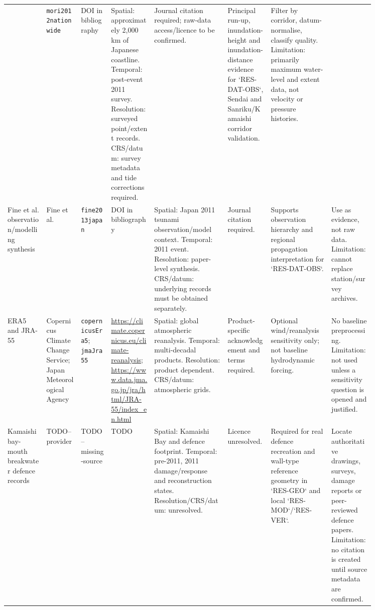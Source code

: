 \begin{landscape}
\begin{longtable}{
    p{0.09\linewidth}
    p{0.08\linewidth}
    p{0.07\linewidth}
    p{0.10\linewidth}
    p{0.17\linewidth}
    p{0.10\linewidth}
    p{0.14\linewidth}
    p{0.10\linewidth}
  }
  &
  \texttt{mori2012nationwide}
  &
  DOI in bibliography
  &
  Spatial: approximately 2,000 km of Japanese coastline. Temporal: post-event 2011 survey. Resolution: surveyed point/extent records. CRS/datum: survey metadata and tide corrections required.
  &
  Journal citation required; raw-data access/licence to be confirmed.
  &
  Principal run-up, inundation-height and inundation-distance evidence for `RES-DAT-OBS`, Sendai and Sanriku/Kamaishi corridor validation.
  &
  Filter by corridor, datum-normalise, classify quality. Limitation: primarily maximum water-level and extent data, not velocity or pressure histories.
  \\
  Fine et al. observation/modelling synthesis
  &
  Fine et al.
  &
  \texttt{fine2013japan}
  &
  DOI in bibliography
  &
  Spatial: Japan 2011 tsunami observation/model context. Temporal: 2011 event. Resolution: paper-level synthesis. CRS/datum: underlying records must be obtained separately.
  &
  Journal citation required.
  &
  Supports observation hierarchy and regional propagation interpretation for `RES-DAT-OBS`.
  &
  Use as evidence, not raw data. Limitation: cannot replace station/survey archives.
  \\
  ERA5 and JRA-55
  &
  Copernicus Climate Change Service; Japan Meteorological Agency
  &
  \texttt{copernicusEra5}; \texttt{jmaJra55}
  &
  \url{https://climate.copernicus.eu/climate-reanalysis}; \url{https://www.data.jma.go.jp/jra/html/JRA-55/index_en.html}
  &
  Spatial: global atmospheric reanalysis. Temporal: multi-decadal products. Resolution: product dependent. CRS/datum: atmospheric grids.
  &
  Product-specific acknowledgement and terms required.
  &
  Optional wind/reanalysis sensitivity only; not baseline hydrodynamic forcing.
  &
  No baseline preprocessing. Limitation: not used unless a sensitivity question is opened and justified.
  \\
  Kamaishi bay-mouth breakwater defence records
  &
  TODO--provider
  &
  TODO--missing-source
  &
  TODO
  &
  Spatial: Kamaishi Bay and defence footprint. Temporal: pre-2011, 2011 damage/response and reconstruction states. Resolution/CRS/datum: unresolved.
  &
  Licence unresolved.
  &
  Required for real defence recreation and wall-type reference geometry in `RES-GEO` and local `RES-MOD`/`RES-VER`.
  &
  Locate authoritative drawings, surveys, damage reports or peer-reviewed defence papers. Limitation: no citation is created until source metadata are confirmed.
  \\
  \hline
\end{longtable}
\end{landscape}

